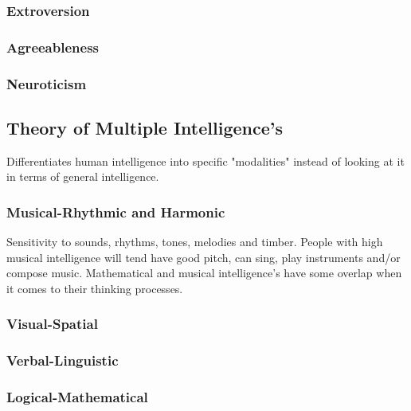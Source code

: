 \documentclass{article}
\begin{document}
\subsubsection{Extroversion}

\newpage 

\subsubsection{Agreeableness}

\newpage 

\subsubsection{Neuroticism} 

\newpage 


\subsection{Theory of Multiple Intelligence's}

Differentiates human intelligence into specific "modalities" instead of looking at it in terms of general intelligence.

\newpage 

\subsubsection{Musical-Rhythmic and Harmonic}

Sensitivity to sounds, rhythms, tones, melodies and timber. People with high musical intelligence will tend have good pitch, can sing, play instruments and/or compose music. Mathematical and musical intelligence's have some overlap when it comes to their thinking processes.  

\newpage 

\subsubsection{Visual-Spatial}



\newpage 

\subsubsection{Verbal-Linguistic}

\newpage 

\subsubsection{Logical-Mathematical}
\end{document}
